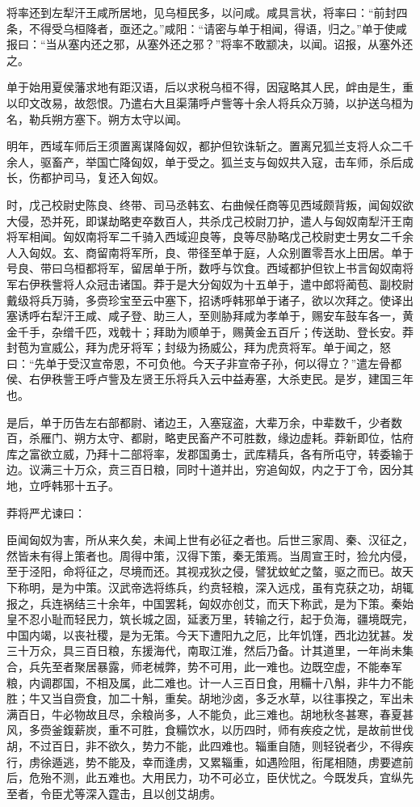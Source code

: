 \documentclass[]{article}
\begin{document}
将率还到左犁汗王咸所居地，见乌桓民多，以问咸。咸具言状，将率曰：``前封四条，不得受乌桓降者，亟还之。''咸阳：``请密与单于相闻，得语，归之。''单于使咸报曰：``当从塞内还之邪，从塞外还之邪？''将率不敢颛决，以闻。诏报，从塞外还之。

单于始用夏侯藩求地有距汉语，后以求税乌桓不得，因寇略其人民，衅由是生，重以印文改易，故怨恨。乃遣右大且渠蒲呼卢訾等十余人将兵众万骑，以护送乌桓为名，勒兵朔方塞下。朔方太守以闻。

明年，西域车师后王须置离谋降匈奴，都护但钦诛斩之。置离兄狐兰支将人众二千余人，驱畜产，举国亡降匈奴，单于受之。狐兰支与匈奴共入寇，击车师，杀后成长，伤都护司马，复还入匈奴。

时，戊己校尉史陈良、终带、司马丞韩玄、右曲候任商等见西域颇背叛，闻匈奴欲大侵，恐并死，即谋劫略吏卒数百人，共杀戊己校尉刀护，遣人与匈奴南犁汗王南将军相闻。匈奴南将军二千骑入西域迎良等，良等尽胁略戊己校尉吏士男女二千余人入匈奴。玄、商留南将军所，良、带径至单于庭，人众别置零吾水上田居。单于号良、带曰乌桓都将军，留居单于所，数呼与饮食。西域都护但钦上书言匈奴南将军右伊秩訾将人众冠击诸国。莽于是大分匈奴为十五单于，遣中郎将蔺苞、副校尉戴级将兵万骑，多赍珍宝至云中塞下，招诱呼韩邪单于诸子，欲以次拜之。使译出塞诱呼右犁汗王咸、咸子登、助三人，至则胁拜咸为孝单于，赐安车鼓车各一，黄金千手，杂缯千匹，戏戟十；拜助为顺单于，赐黄金五百斤；传送助、登长安。莽封苞为宣威公，拜为虎牙将军；封级为扬威公，拜为虎贲将军。单于闻之，怒曰：``先单于受汉宣帝恩，不可负他。今天子非宣帝子孙，何以得立？''遣左骨都侯、右伊秩訾王呼卢訾及左贤王乐将兵入云中益寿塞，大杀吏民。是岁，建国三年也。

是后，单于历告左右部都尉、诸边王，入塞寇盗，大辈万余，中辈数千，少者数百，杀雁门、朔方太守、都尉，略吏民畜产不可胜数，缘边虚耗。莽新即位，怙府库之富欲立威，乃拜十二部将率，发郡国勇士，武库精兵，各有所屯守，转委输于边。议满三十万众，贲三百日粮，同时十道并出，穷追匈奴，内之于丁令，因分其地，立呼韩邪十五子。

莽将严尤谏曰：

臣闻匈奴为害，所从来久矣，未闻上世有必征之者也。后世三家周、秦、汉征之，然皆未有得上策者也。周得中策，汉得下策，秦无策焉。当周宣王时，猃允内侵，至于泾阳，命将征之，尽境而还。其视戎狄之侵，譬犹蚊虻之螫，驱之而已。故天下称明，是为中策。汉武帝选将练兵，约贲轻粮，深入远戍，虽有克获之功，胡辄报之，兵连祸结三十余年，中国罢耗，匈奴亦创艾，而天下称武，是为下策。秦始皇不忍小耻而轻民力，筑长城之固，延袤万里，转输之行，起于负海，疆境既完，中国内竭，以丧社稷，是为无策。今天下遭阳九之厄，比年饥馑，西北边犹甚。发三十万众，具三百日粮，东援海代，南取江淮，然后乃备。计其道里，一年尚未集合，兵先至者聚居暴露，师老械弊，势不可用，此一难也。边既空虚，不能奉军粮，内调郡国，不相及属，此二难也。计一人三百日食，用糒十八斛，非牛力不能胜；牛又当自赍食，加二十斛，重矣。胡地沙卤，多乏水草，以往事揆之，军出未满百日，牛必物故且尽，余粮尚多，人不能负，此三难也。胡地秋冬甚寒，春夏甚风，多赍釜鍑薪炭，重不可胜，食糒饮水，以历四时，师有疾疫之忧，是故前世伐胡，不过百日，非不欲久，势力不能，此四难也。辎重自随，则轻锐者少，不得疾行，虏徐遁逃，势不能及，幸而逢虏，又累辎重，如遇险阻，衔尾相随，虏要遮前后，危殆不测，此五难也。大用民力，功不可必立，臣伏忧之。今既发兵，宜纵先至者，令臣尤等深入霆击，且以创艾胡虏。
\end{document}

